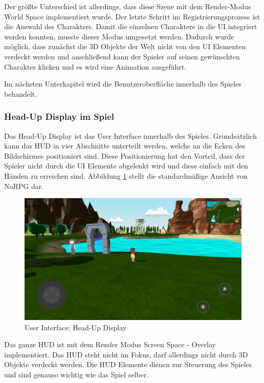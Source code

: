 			Der größte Unterschied ist allerdings, dass diese Szene mit dem Render-Modus World Space implementiert wurde. Der letzte Schritt im Registrierungsprozess ist die Auswahl des Charakters. Damit die einzelnen Charaktere in die UI integriert werden konnten, musste dieser Modus umgesetzt werden. Dadurch wurde möglich, dass zunächst die 3D Objekte der Welt nicht von den UI Elementen verdeckt werden und anschließend kann der Spieler auf seinen gewünschten Charakter klicken und es wird eine Animation ausgeführt. 
			
			Im nächsten Unterkapitel wird die Benutzeroberfläche innerhalb des Spieles behandelt. 
		
		\subsubsection{Head-Up Display im Spiel}
			Das Head-Up Display ist das User Interface innerhalb des Spieles. Grundsätzlich kann das HUD in vier Abschnitte unterteilt werden, welche an die Ecken des Bildschirmes positioniert sind. Diese Positionierung hat den Vorteil, dass der Spieler nicht durch die UI Elemente abgelenkt wird und diese einfach mit den Händen zu erreichen sind. Abbildung \ref{alwaysOnUI} stellt die standardmäßige Ansicht von NoRPG dar.
			
			\begin{figure}[htbp]
				\centering 
				\label{alwaysOnUI}
				\includegraphics[width=13cm]{pics/alwaysOnUI.png}
				\caption{User Interface: Head-Up Display}
			\end{figure}
		
			Das ganze HUD ist mit dem Render Modus Screen Space - Overlay implementiert. Das HUD steht nicht im Fokus, darf allerdings nicht durch 3D Objekte verdeckt werden. Die HUD Elemente dienen zur Steuerung des Spieles und sind genauso wichtig wie das Spiel selber.
			

